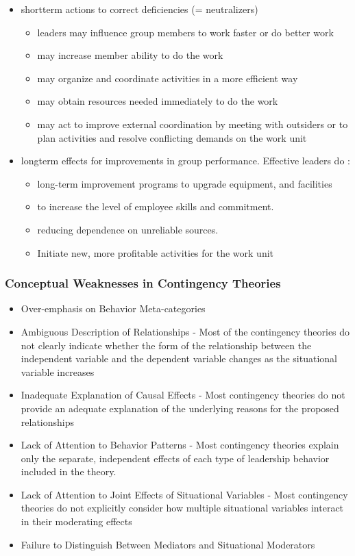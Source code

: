 \begin{itemize}
	\item short­term actions to correct deficiencies (= neutralizers)
	\begin{itemize}
		\item leaders may influence group members to work faster or do better work
			\item  may increase member ability to do the work
			\item  may organize and coordinate activities in a more efficient way
			\item  may obtain resources needed immediately to do the work
			\item  may act to improve external coordination by meeting with outsiders or to plan activities and resolve conflicting demands on the work unit
	\end{itemize}
	\item long­term effects for improvements in group performance. Effective leaders do :
	\begin{itemize}
		\item long-term improvement programs to upgrade equipment, and facilities
		\item to increase the level of employee skills and commitment.
		\item reducing dependence on unreliable sources.
		\item Initiate new, more profitable activities for the work unit
	\end{itemize}			
\end{itemize}


\subsubsection{Conceptual Weaknesses in Contingency Theories} %
\label{ssub:conceptual_weaknesses_in_contingency_theories}

\begin{itemize}
	\item Over-emphasis on Behavior Meta-categories
	\item Ambiguous Description of Relationships - Most of the contingency theories do not clearly indicate whether the form of the relationship between the independent variable and the dependent variable changes as the situational variable increases
	\item Inadequate Explanation of Causal Effects - Most contingency theories do not provide an adequate explanation of the underlying reasons for the proposed relationships
	\item Lack of Attention to Behavior Patterns - Most contingency theories explain only the separate, independent effects of each type of leadership behavior included in the theory.
	\item Lack of Attention to Joint Effects of Situational Variables - Most contingency theories do not explicitly consider how multiple situational variables interact in their moderating effects
	\item Failure to Distinguish Between Mediators and Situational Moderators
\end{itemize}

